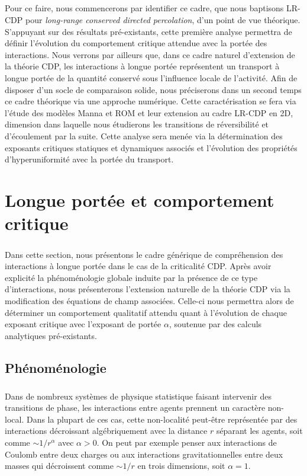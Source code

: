 \subparagraph{}Pour ce faire, nous commencerons par identifier ce cadre, que nous baptisons LR-CDP pour \textit{long-range conserved directed percolation}, d'un point de vue théorique. S'appuyant sur des résultats pré-existants, cette première analyse permettra de définir l'évolution du comportement critique attendue avec la portée des interactions. Nous verrons par ailleurs que, dans ce cadre naturel d'extension de la théorie CDP, les interactions à longue portée représentent un transport à longue portée de la quantité conservé sous l'influence locale de l'activité. Afin de disposer d'un socle de comparaison solide, nous préciserons dans un second temps ce cadre théorique via une approche numérique. Cette caractérisation se fera via l'étude des modèles Manna et ROM et leur extension au cadre LR-CDP en 2D, dimension dans laquelle nous étudierons les transitions de réversibilité et d'écoulement par la suite. Cette analyse sera menée via la détermination des exposants critiques statiques et dynamiques associés et l'évolution des propriétés d'hyperuniformité avec la portée du transport.

\section{Longue portée et comportement critique}

\subparagraph{}Dans cette section, nous présentons le cadre générique de compréhension des interactions à longue portée dans le cas de la criticalité CDP. Après avoir explicité la phénoménologie globale induite par la présence de ce type d'interactions, nous présenterons l'extension naturelle de la théorie CDP via la modification des équations de champ associées. Celle-ci nous permettra alors de déterminer un comportement qualitatif attendu quant à l'évolution de chaque exposant critique avec l'exposant de portée $\alpha$, soutenue par des calculs analytiques pré-existants.

\label{sec:LRCanonique}

\subsection{Phénoménologie}

\subparagraph{}Dans de nombreux systèmes de physique statistique faisant intervenir des transitions de phase, les interactions entre agents prennent un caractère non-local. Dans la plupart de ces cas, cette non-localité peut-être représentée par des interactions décroissant algébriquement avec la distance $r$ séparant les agents, soit comme $\sim 1/r^\alpha$ avec $\alpha >0$. On peut par exemple penser aux interactions de Coulomb entre deux charges ou aux interactions gravitationnelles entre deux masses qui décroissent comme $\sim 1/r$ en trois dimensions, soit $\alpha = 1$. 

